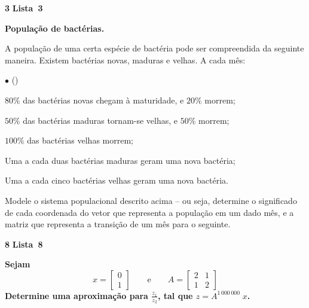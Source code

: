 \documentclass{article}
\newenvironment{question}
    {\medskip\bfseries\large}
    {\medskip}
\newcounter{exe-list}
\newenvironment{exe-list}
    {\begin{list}{(\alph{exe-list})}{\usecounter{exe-list}}}
    {\end{list}}
\newenvironment{exe}[2][Sala]
    {\bigskip\noindent\par\ifthenelse{\equal{#1}{}}%
        {\textbf{\LARGE #2}}%
        {\textbf{\LARGE #1~#2}}%
    \medskip\noindent\par}
    {\bigskip}
\begin{document}
\begin{exe}[Lista]{3}
    \begin{question}
        População de bactérias. \medskip\noindent\par
        A população de uma certa espécie de bactéria
        pode ser compreendida da seguinte maneira.
        Existem bactérias novas, maduras e velhas.
        A cada mês:
        \begin{list}{\(\bullet\) ()}{}
            \addtocounter{exe-list}{-1}
            \item
                \(80\%\) das bactérias novas
                chegam à maturidade, e
                \(20\%\) morrem;
            \item
                \(50\%\) das bactérias maduras
                tornam-se velhas, e
                \(50\%\) morrem;
            \item
                \(100\%\) das bactérias velhas morrem;
            \item
                Uma a cada duas bactérias maduras
                geram uma nova bactéria;
            \item
                Uma a cada cinco bactérias velhas
                geram uma nova bactéria.
        \end{list}

        \begin{exe-list}
            \item
                Modele o sistema populacional descrito acima --
                ou seja, determine o significado de
                cada coordenada do vetor que representa a população
                em um dado mês,
                e a matriz que representa
                a transição de um mês para o seguinte.
        \end{exe-list}
    \end{question}
\end{exe}

\begin{exe}[Lista]{8}
    \begin{question}
        Sejam
        \[
            x = \begin{bmatrix}
                0 \\ 1
            \end{bmatrix}
            \qquad\text{e}\qquad
            A = \begin{bmatrix}
                2 & 1 \\ 1 & 2
            \end{bmatrix}
        \]
        Determine uma aproximação para \(\frac{z_1}{z_2}\),
        tal que \(z = A^{1 \, 000 \, 000} \; x\).
    \end{question}
\end{exe}
\end{document}
